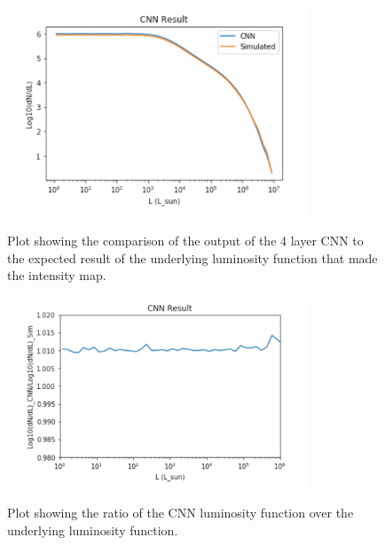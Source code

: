 \documentclass{article}
\begin{document}
		\begin{figure}[H]
			\centering \label{fig:CNN_test1}
			\includegraphics[width=0.8\textwidth]{CNN_test1.pdf}
			\caption{Plot showing the comparison of the output of the 4 layer CNN to the expected result of the underlying luminosity function that made the intensity map.}
		\end{figure}

		\begin{figure}[H]
			\centering \label{fig:CNN_test1_ratio}
			\includegraphics[width=0.8\textwidth]{CNN_test1_ratio.pdf}
			\caption{Plot showing the ratio of the CNN luminosity function over the underlying luminosity function.}
		\end{figure}
\end{document}
